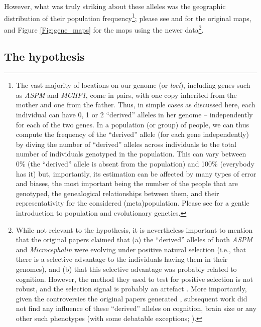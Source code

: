 \documentclass[twoside,twocolumn]{article}
\begin{document}
However, what was truly striking about these alleles was the geographic distribution of their population frequency\footnote{The vast majority of locations on our genome (or \emph{loci}), including genes such as \textit{ASPM} and \textit{MCHP1}, come in pairs, with one copy inherited from the mother and one from the father. Thus, in simple cases as discussed here, each individual can have 0, 1 or 2 ``derived'' alleles in her genome -- independently for each of the two genes. In a population (or group) of people, we can thus compute the frequency of the ``derived'' allele (for each gene independently) by diving the number of ``derived'' alleles across individuals to the total number of individuals genotyped in the population. This can vary between 0\% (the ``derived'' allele is absent from the population) and 100\% (everybody has it) but, importantly, its estimation can be affected by many types of error and biases, the most important being the number of the people that are genotyped, the genealogical relationships between them, and their representativity for the considered (meta)population. Please see \citet{jobling_human_2013} for a gentle introduction to population and evolutionary genetics.}; please see \citet[Fig. 1., p. 1721]{mekelbobrov_aspm_2005} and \citet[Fig. 3., p. 1719]{evans_microcephalin_2005} for the original maps, and Figure \ref{Fig:gene_maps} for the maps using the newer data\footnote{While not relevant to the \citet{dediu_ladd_2007} hypothesis, it is nevertheless important to mention that the original papers claimed that (a) the ``derived'' alleles of both \textit{ASPM} and \textit{Microcephalin} were evolving under positive natural selection (i.e., that there is a selective advantage to the individuals having them in their genomes), and (b) that this selective advantage was probably related to cognition. However, the method they used to test for positive selection is not robust, and the selection signal is probably an artefact \citep{currat_comment_2006,timpson_comment_2007}. More importantly, given the controversies the original papers generated \citep{saini_superior_2019}, subsequent work did not find any influence of these ``derived'' alleles on cognition, brain size or any other such phenotypes \citep{mekelbobrov_noselection_2007,rushton_noevidence_2007} (with some debatable exceptions; \citealp{woodley_relationship_2014,frost_aspmwriting_2008}).}.

\subsection{The hypothesis}
\end{document}
